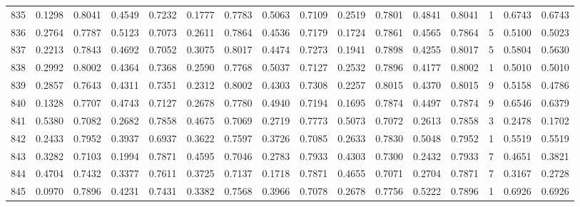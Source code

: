 \begin{tabular}{lrrrrrrrrrrrrrrr}
835 &      0.1298 &  0.8041 &  0.4549 &  0.7232 &  0.1777 &  0.7783 &  0.5063 &  0.7109 &  0.2519 &  0.7801 &   0.4841 &     0.8041 &      1 &                    0.6743 &                     0.6743 \\
836 &      0.2764 &  0.7787 &  0.5123 &  0.7073 &  0.2611 &  0.7864 &  0.4536 &  0.7179 &  0.1724 &  0.7861 &   0.4565 &     0.7864 &      5 &                    0.5100 &                     0.5023 \\
837 &      0.2213 &  0.7843 &  0.4692 &  0.7052 &  0.3075 &  0.8017 &  0.4474 &  0.7273 &  0.1941 &  0.7898 &   0.4255 &     0.8017 &      5 &                    0.5804 &                     0.5630 \\
838 &      0.2992 &  0.8002 &  0.4364 &  0.7368 &  0.2590 &  0.7768 &  0.5037 &  0.7127 &  0.2532 &  0.7896 &   0.4177 &     0.8002 &      1 &                    0.5010 &                     0.5010 \\
839 &      0.2857 &  0.7643 &  0.4311 &  0.7351 &  0.2312 &  0.8002 &  0.4303 &  0.7308 &  0.2257 &  0.8015 &   0.4370 &     0.8015 &      9 &                    0.5158 &                     0.4786 \\
840 &      0.1328 &  0.7707 &  0.4743 &  0.7127 &  0.2678 &  0.7780 &  0.4940 &  0.7194 &  0.1695 &  0.7874 &   0.4497 &     0.7874 &      9 &                    0.6546 &                     0.6379 \\
841 &      0.5380 &  0.7082 &  0.2682 &  0.7858 &  0.4675 &  0.7069 &  0.2719 &  0.7773 &  0.5073 &  0.7072 &   0.2613 &     0.7858 &      3 &                    0.2478 &                     0.1702 \\
842 &      0.2433 &  0.7952 &  0.3937 &  0.6937 &  0.3622 &  0.7597 &  0.3726 &  0.7085 &  0.2633 &  0.7830 &   0.5048 &     0.7952 &      1 &                    0.5519 &                     0.5519 \\
843 &      0.3282 &  0.7103 &  0.1994 &  0.7871 &  0.4595 &  0.7046 &  0.2783 &  0.7933 &  0.4303 &  0.7300 &   0.2432 &     0.7933 &      7 &                    0.4651 &                     0.3821 \\
844 &      0.4704 &  0.7432 &  0.3377 &  0.7611 &  0.3725 &  0.7137 &  0.1718 &  0.7871 &  0.4655 &  0.7071 &   0.2704 &     0.7871 &      7 &                    0.3167 &                     0.2728 \\
845 &      0.0970 &  0.7896 &  0.4231 &  0.7431 &  0.3382 &  0.7568 &  0.3966 &  0.7078 &  0.2678 &  0.7756 &   0.5222 &     0.7896 &      1 &                    0.6926 &                     0.6926 \\

\end{tabular}
